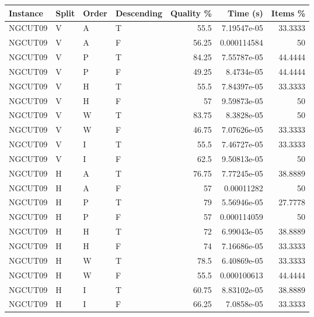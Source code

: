\begin{tabular}{llllrrr}
    \hline
    Instance & Split & Order & Descending & Quality \% & Time (s)    & Items \% \\
    \hline
    NGCUT09  & V     & A     & T          & 55.5       & 7.19547e-05 & 33.3333  \\
    NGCUT09  & V     & A     & F          & 56.25      & 0.000114584 & 50       \\
    NGCUT09  & V     & P     & T          & 84.25      & 7.55787e-05 & 44.4444  \\
    NGCUT09  & V     & P     & F          & 49.25      & 8.4734e-05  & 44.4444  \\
    NGCUT09  & V     & H     & T          & 55.5       & 7.84397e-05 & 33.3333  \\
    NGCUT09  & V     & H     & F          & 57         & 9.59873e-05 & 50       \\
    NGCUT09  & V     & W     & T          & 83.75      & 8.3828e-05  & 50       \\
    NGCUT09  & V     & W     & F          & 46.75      & 7.07626e-05 & 33.3333  \\
    NGCUT09  & V     & I     & T          & 55.5       & 7.46727e-05 & 33.3333  \\
    NGCUT09  & V     & I     & F          & 62.5       & 9.50813e-05 & 50       \\
    NGCUT09  & H     & A     & T          & 76.75      & 7.77245e-05 & 38.8889  \\
    NGCUT09  & H     & A     & F          & 57         & 0.00011282  & 50       \\
    NGCUT09  & H     & P     & T          & 79         & 5.56946e-05 & 27.7778  \\
    NGCUT09  & H     & P     & F          & 57         & 0.000114059 & 50       \\
    NGCUT09  & H     & H     & T          & 72         & 6.99043e-05 & 38.8889  \\
    NGCUT09  & H     & H     & F          & 74         & 7.16686e-05 & 33.3333  \\
    NGCUT09  & H     & W     & T          & 78.5       & 6.40869e-05 & 33.3333  \\
    NGCUT09  & H     & W     & F          & 55.5       & 0.000100613 & 44.4444  \\
    NGCUT09  & H     & I     & T          & 60.75      & 8.83102e-05 & 38.8889  \\
    NGCUT09  & H     & I     & F          & 66.25      & 7.0858e-05  & 33.3333  \\

\end{tabular}
